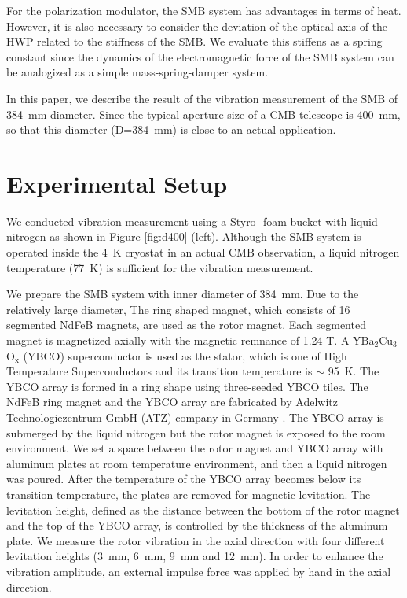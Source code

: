 \documentclass[a4paper]{jpconf}
\begin{document}
For the polarization modulator, the SMB system has advantages in terms of heat.
However, it is also necessary to consider the deviation of the optical axis of the HWP related to the stiffness of the SMB.
We evaluate this stiffens as a spring constant since the dynamics of the electromagnetic force of the SMB system can be analogized as a simple mass-spring-damper system.

In this paper, we describe the result of the vibration measurement of the SMB of 384~mm diameter.
Since the typical aperture size of a CMB telescope is 400~mm, so that this diameter (D=384~mm) is close to an actual application.

\section*{Experimental Setup}


We conducted vibration measurement using a Styro- foam bucket with liquid nitrogen as shown in Figure \ref{fig:d400} (left).
Although the SMB system is operated inside the 4~K cryostat in an actual CMB observation, a liquid nitrogen temperature (77~K) is sufficient for the vibration measurement.

We prepare the SMB system with inner diameter of 384~mm.
Due to the relatively large diameter, The ring shaped magnet, which consists of 16 segmented NdFeB magnets, are used as the rotor magnet.
Each segmented magnet is magnetized axially with the magnetic remnance of 1.24 T.
A YBa$_{2}$Cu$_{3}$O$_{\mathrm{x}}$ (YBCO) superconductor is used as the stator, which is one of High Temperature Superconductors and its transition temperature is $\sim$ 95~K.
The YBCO array is formed in a ring shape using three-seeded YBCO tiles.
The NdFeB ring magnet and the YBCO array are fabricated by Adelwitz Technologiezentrum GmbH (ATZ) company in Germany \cite{ATZ}.
The YBCO array is submerged by the liquid nitrogen but the rotor magnet is exposed to the room environment.
We set a space between the rotor magnet and YBCO array with aluminum plates at room temperature environment, and then a liquid nitrogen was poured.
After the temperature of the YBCO array becomes below its transition temperature, the plates are removed for magnetic levitation.
The levitation height, defined as the distance between the bottom of the rotor magnet and the top of the YBCO array, is controlled by the thickness of the aluminum plate.
We measure the rotor vibration in the axial direction with four different levitation heights (3~mm, 6~mm, 9~mm and 12~mm).
In order to enhance the vibration amplitude, an external impulse force was applied by hand in the axial direction.
\end{document}
